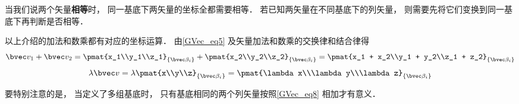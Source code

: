 当我们说两个矢量\textbf{相等}时， 同一基底下两矢量的坐标全都需要相等． 若已知两矢量在不同基底下的列矢量， 则需要先将它们变换到同一基底下再判断是否相等．

以上介绍的加法和数乘都有对应的坐标运算． 由\autoref{GVec_eq5} 及矢量加法和数乘的交换律和结合律得
\begin{equation}\label{GVec_eq8}
\bvec v_1 + \bvec v_2 = \pmat{x_1\\y_1\\z_1}_{\{\bvec\beta_i\}} + \pmat{x_2\\y_2\\z_2}_{\{\bvec\beta_i\}} = \pmat{x_1 + x_2\\y_1 + y_2\\z_1 + z_2}_{\{\bvec\beta_i\}}
\end{equation}
\begin{equation}\label{GVec_eq9}
\lambda \bvec v = \lambda\pmat{x\\y\\z}_{\{\bvec\beta_i\}} = \pmat{\lambda x\\\lambda y\\\lambda z}_{\{\bvec\beta_i\}}
\end{equation}

要特别注意的是， 当定义了多组基底时， 只有基底相同的两个列矢量按照\autoref{GVec_eq8} 相加才有意义．
